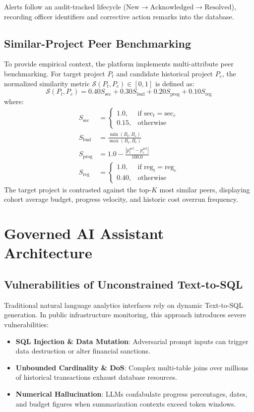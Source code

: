 \documentclass[conference]{IEEEtran}
\begin{document}
Alerts follow an audit-tracked lifecycle ($\text{New} \to \text{Acknowledged} \to \text{Resolved}$), recording officer identifiers and corrective action remarks into the database.

\subsection{Similar-Project Peer Benchmarking}
To provide empirical context, the platform implements multi-attribute peer benchmarking. For target project $P_t$ and candidate historical project $P_c$, the normalized similarity metric $\mathcal{S}(P_t, P_c) \in [0, 1]$ is defined as:
\begin{equation}
\mathcal{S}(P_t, P_c) = 0.40 S_{\text{sec}} + 0.30 S_{\text{bud}} + 0.20 S_{\text{prog}} + 0.10 S_{\text{reg}}
\end{equation}
where:
\begin{align}
S_{\text{sec}} &= \begin{cases} 1.0, & \text{if } \text{sec}_t = \text{sec}_c \\ 0.15, & \text{otherwise} \end{cases} \\
S_{\text{bud}} &= \frac{\min(B_t, B_c)}{\max(B_t, B_c)} \\
S_{\text{prog}} &= 1.0 - \frac{|p_t^{\text{act}} - p_c^{\text{act}}|}{100.0} \\
S_{\text{reg}} &= \begin{cases} 1.0, & \text{if } \text{reg}_t = \text{reg}_c \\ 0.40, & \text{otherwise} \end{cases}
\end{align}
The target project is contrasted against the top-$K$ most similar peers, displaying cohort average budget, progress velocity, and historic cost overrun frequency.

\section{Governed AI Assistant Architecture}

\subsection{Vulnerabilities of Unconstrained Text-to-SQL}
Traditional natural language analytics interfaces rely on dynamic Text-to-SQL generation. In public infrastructure monitoring, this approach introduces severe vulnerabilities:
\begin{itemize}
    \item \textbf{SQL Injection \& Data Mutation}: Adversarial prompt inputs can trigger data destruction or alter financial sanctions.
    \item \textbf{Unbounded Cardinality \& DoS}: Complex multi-table joins over millions of historical transactions exhaust database resources.
    \item \textbf{Numerical Hallucination}: LLMs confabulate progress percentages, dates, and budget figures when summarization contexts exceed token windows.
\end{itemize}
\end{document}
